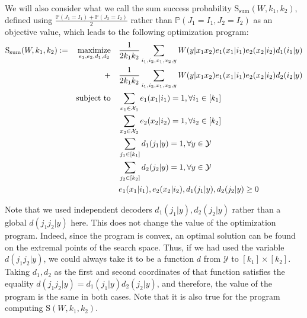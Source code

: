 
We will also consider what we call the sum success probability $\mathrm{S}_{\text{sum}}(W,k_1,k_2)$, defined using $\frac{\mathbb{P}\left(J_1=I_1\right)+\mathbb{P}\left(J_2=I_2\right)}{2}$ rather than $\mathbb{P}\left(J_1=I_1,J_2=I_2\right)$ as an objective value, which leads to the following optimization program:
\begin{equation}
  \begin{aligned}
    \mathrm{S}_{\text{sum}}(W,k_1,k_2) := &&\underset{e_1,e_2,d_1,d_2}{\operatorname{\text{maximize}}} &&& \frac{1}{2k_1k_2} \sum_{i_1,i_2,x_1,x_2,y} W(y|x_1x_2)e_1(x_1|i_1)e_2(x_2|i_2)d_1(i_1|y)\\
    &&+&&& \frac{1}{2k_1k_2} \sum_{i_1,i_2,x_1,x_2,y} W(y|x_1x_2)e_1(x_1|i_1)e_2(x_2|i_2)d_2(i_2|y)\\
    &&\operatorname{\text{subject to}} &&& \sum_{x_1 \in \mathcal{X}_1} e_1(x_1|i_1) = 1, \forall i_1 \in [k_1]\\
    &&&&&  \sum_{x_2 \in \mathcal{X}_2} e_2(x_2|i_2) = 1, \forall i_2 \in [k_2]\\
    &&&&& \sum_{j_1 \in [k_1]} d_1(j_1|y) = 1, \forall y \in \mathcal{Y}\\
    &&&&& \sum_{j_2 \in [k_2]} d_2(j_2|y) = 1, \forall y \in \mathcal{Y}\\
    &&&&& e_1(x_1|i_1), e_2(x_2|i_2), d_1(j_1|y), d_2(j_2|y) \geq 0
  \end{aligned}
\end{equation}

Note that we used independent decoders $d_1(j_1|y),d_2(j_2|y)$ rather than a global $d(j_1j_2|y)$ here. This does not change the value of the optimization program. Indeed, since the program is convex, an optimal solution can be found on the extremal points of the search space. Thus, if we had used the variable $d(j_1j_2|y)$, we could always take it to be a function $d$ from $\mathcal{Y}$ to $[k_1]\times[k_2]$. Taking $d_1,d_2$ as the first and second coordinates of that function satisfies the equality $d(j_1j_2|y) = d_1(j_1|y)d_2(j_2|y)$, and therefore, the value of the program is the same in both cases. Note that it is also true for the program computing $\mathrm{S}(W,k_1,k_2)$.

